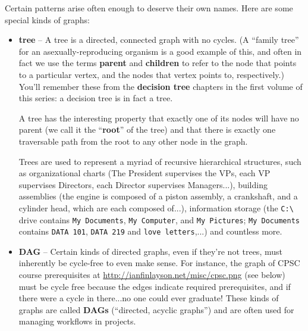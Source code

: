 Certain patterns arise often enough to deserve their own names. Here are some
special kinds of graphs:
\begin{itemize}



\item \textbf{tree} -- A tree is a directed, connected graph with no cycles. (A
``family tree'' for an asexually-reproducing organism is a good example of
this, and often in fact we use the terms \textbf{parent} and \textbf{children}
to refer to the node that points to a particular vertex, and the nodes that
vertex points to, respectively.) You'll remember these from the
\textbf{decision tree} chapters in the first volume of this series: a decision
tree is in fact a tree.

A tree has the interesting property that exactly one of its nodes will have no
parent (we call it the ``\textbf{root}'' of the tree) and that there is
exactly one traversable path from the root to any other node in the graph.

Trees are used to represent a myriad of recursive hierarchical structures, such
as organizational charts (The President supervises the VPs, each VP supervises
Directors, each Director supervises Managers...), building assemblies (the
engine is composed of a piston assembly, a crankshaft, and a cylinder head,
which are each composed of...), information storage (the
\texttt{C:\textbackslash} drive contains \texttt{My Documents}, \texttt{My
Computer}, and \texttt{My Pictures}; \texttt{My Documents} contains
\texttt{DATA 101}, \texttt{DATA 219} and \texttt{love letters},...) and
countless more.

\medskip

\item \textbf{DAG} -- Certain kinds of directed graphs, even if they're not
trees, must inherently be cycle-free to even make sense. For instance, the
graph of CPSC course prerequisites at
\url{http://ianfinlayson.net/misc/cpsc.png} (see below) must be cycle free
because the edges indicate required prerequisites, and if there were a cycle in
there...no one could ever graduate! These kinds of graphs are called
\textbf{DAGs} (``directed, acyclic graphs'') and are often used for managing
workflows in projects.


\end{itemize}
